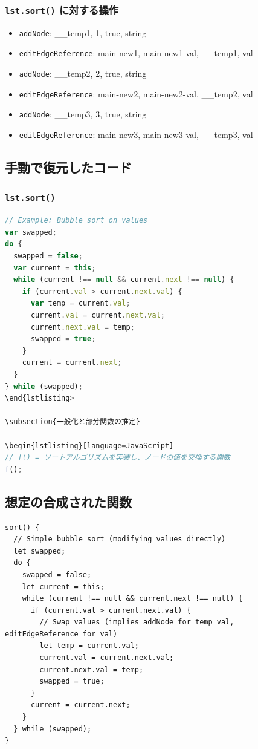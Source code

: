 \documentclass{article}
\begin{document}
\subsubsection{\texttt{lst.sort()} に対する操作}
\begin{itemize}
  \item \texttt{addNode}: \_\_temp1, 1, true, string
  \item \texttt{editEdgeReference}: main-new1, main-new1-val, \_\_temp1, val
  \item \texttt{addNode}: \_\_temp2, 2, true, string
  \item \texttt{editEdgeReference}: main-new2, main-new2-val, \_\_temp2, val
  \item \texttt{addNode}: \_\_temp3, 3, true, string
  \item \texttt{editEdgeReference}: main-new3, main-new3-val, \_\_temp3, val
\end{itemize}

\subsection{手動で復元したコード}

\subsubsection{\texttt{lst.sort()}}
\begin{lstlisting}[language=JavaScript]
// Example: Bubble sort on values
var swapped;
do {
  swapped = false;
  var current = this;
  while (current !== null && current.next !== null) {
    if (current.val > current.next.val) {
      var temp = current.val;
      current.val = current.next.val;
      current.next.val = temp;
      swapped = true;
    }
    current = current.next;
  }
} while (swapped);
\end{lstlisting>

\subsection{一般化と部分関数の推定}

\begin{lstlisting}[language=JavaScript]
// f() = ソートアルゴリズムを実装し、ノードの値を交換する関数
f();
\end{lstlisting}

\subsection{想定の合成された関数}
\begin{lstlisting}
sort() {
  // Simple bubble sort (modifying values directly)
  let swapped;
  do {
    swapped = false;
    let current = this;
    while (current !== null && current.next !== null) {
      if (current.val > current.next.val) {
        // Swap values (implies addNode for temp val, editEdgeReference for val)
        let temp = current.val;
        current.val = current.next.val;
        current.next.val = temp;
        swapped = true;
      }
      current = current.next;
    }
  } while (swapped);
}
\end{lstlisting}
\end{document}
